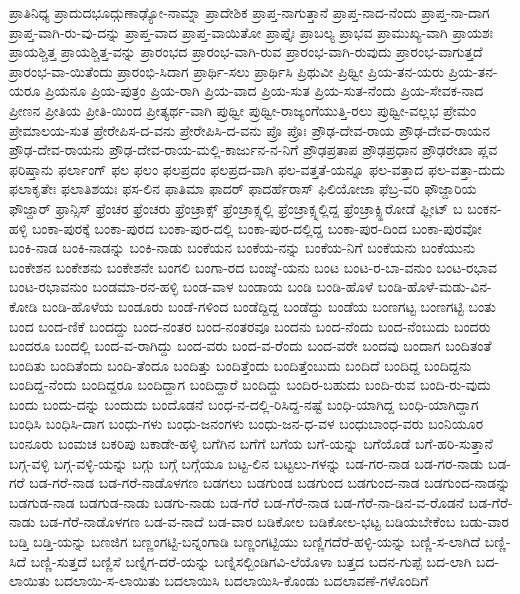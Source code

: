 {ಪ್ರಾತಿನಿಧ್ಯ
ಪ್ರಾದುದಭೂದ್ಗುಣಾಢ್ಯೋ-ನಾಮ್ನಾ
ಪ್ರಾದೇಶಿಕ
ಪ್ರಾಪ್ತ-ನಾಗುತ್ತಾನೆ
ಪ್ರಾಪ್ತ-ನಾದ-ನೆಂದು
ಪ್ರಾಪ್ತ-ನಾ-ದಾಗ
ಪ್ರಾಪ್ತ-ವಾಗಿ-ರು-ವು-ದನ್ನು
ಪ್ರಾಪ್ತ-ವಾದ
ಪ್ರಾಪ್ತ-ವಾಯಿತೋ
ಪ್ರಾಪ್ತೈಃ
ಪ್ರಾಬಲ್ಯ
ಪ್ರಾಭವ
ಪ್ರಾಮುಖ್ಯ-ವಾಗಿ
ಪ್ರಾಯಶಃ
ಪ್ರಾಯಶ್ಚಿತ್ತ
ಪ್ರಾಯಶ್ಚಿತ್ತ-ವನ್ನು
ಪ್ರಾರಂಭದ
ಪ್ರಾರಂಭ-ವಾಗಿ-ರುವ
ಪ್ರಾರಂಭ-ವಾಗಿ-ರುವುದು
ಪ್ರಾರಂಭ-ವಾಗುತ್ತದೆ
ಪ್ರಾರಂಭ-ವಾ-ಯಿತೆಂದು
ಪ್ರಾರಂಭಿ-ಸಿದಾಗ
ಪ್ರಾರ್ಥಿ-ಸಲು
ಪ್ರಾರ್ಥಿಸಿ
ಪ್ರಿಥುವೀ
ಪ್ರಿಥ್ವೀ
ಪ್ರಿಯ-ತನ-ಯರು
ಪ್ರಿಯ-ತನ-ಯರೂ
ಪ್ರಿಯನೂ
ಪ್ರಿಯ-ಪುತ್ರಂ
ಪ್ರಿಯ-ರಾಗಿ
ಪ್ರಿಯ-ವಾದ
ಪ್ರಿಯ-ಸುತ
ಪ್ರಿಯ-ಸುತ-ನೆಂದು
ಪ್ರಿಯ-ಸೇವಕ-ನಾದ
ಪ್ರೀಣನ
ಪ್ರೀತಿಯ
ಪ್ರೀತಿ-ಯಿಂದ
ಪ್ರೀತ್ಯರ್ಥ-ವಾಗಿ
ಪ್ರುಥ್ವೀ
ಪ್ರುಥ್ವೀ-ರಾಜ್ಯಂಗೆಯುತ್ತಿ-ರಲು
ಪ್ರುಥ್ವೀ-ವಲ್ಲಭ
ಪ್ರೇಮಂ
ಪ್ರೇಮಾಲಯ-ಸುತ
ಪ್ರೇರೇಪಿಸ-ದ-ವನು
ಪ್ರೇರೇಪಿಸಿ-ದ-ವನು
ಪ್ರೊ
ಪ್ರೊಃ
ಪ್ರೌಢ-ದೇವ-ರಾಯ
ಪ್ರೌಢ-ದೇವ-ರಾಯನ
ಪ್ರೌಢ-ದೇವ-ರಾಯನು
ಪ್ರೌಢ-ದೇವ-ರಾಯ-ಮಲ್ಲಿ-ಕಾರ್ಜುನ-ನ-ನಿಗೆ
ಪ್ರೌಢಪ್ರತಾಪ
ಪ್ರೌಢಪ್ರಧಾನ
ಪ್ರೌಢರೇಖಾ
ಪ್ಲವ
ಫರಿಷ್ತಾನು
ಫರ್ಲಾಂಗ್
ಫಲ
ಫಲಂ
ಫಲಪ್ರದಂ
ಫಲಪ್ರದ-ವಾಗಿ
ಫಲ-ವತ್ತತೆ-ಯನ್ನೂ
ಫಲ-ವತ್ತಾದ
ಫಲ-ವತ್ತಾ-ದುದು
ಫಲಾಕೃತೇಃ
ಫಲಾತಿಶಯಃ
ಫಸ-ಲಿನ
ಫಾತಿಮಾ
ಫಾದರ್
ಫಾದರ್ಹೆರಾಸ್
ಫಿಲಿಯೋಜಾ
ಫೆಬ್ರ-ವರಿ
ಫೌಜ್ದಾರಿಯ
ಫೌಜ್ದಾರ್
ಫ್ರಾನ್ಸಿಸ್
ಫ್ರೆಂಚರ
ಫ್ರೆಂಚರು
ಫ್ರೆಂಚ್ರಾಕ್ಸ್
ಫ್ರೆಂಚ್ರಾಕ್ಸ್ನಲ್ಲಿ
ಫ್ರೆಂಚ್ರಾಕ್ಸ್ನಲ್ಲಿದ್ದ
ಫ್ರೆಂಚ್ರಾಕ್ಸ್ಹಿರೋಡೆ
ಫ್ಲೀಟ್
ಬ
ಬಂಕನ-ಹಳ್ಳಿ
ಬಂಕಾ-ಪುರಕ್ಕೆ
ಬಂಕಾ-ಪುರದ
ಬಂಕಾ-ಪುರ-ದಲ್ಲಿ
ಬಂಕಾ-ಪುರ-ದಲ್ಲಿದ್ದ
ಬಂಕಾ-ಪುರ-ದಿಂದ
ಬಂಕಾ-ಪುರವೋ
ಬಂಕಿ-ನಾಡ
ಬಂಕಿ-ನಾಡನ್ನು
ಬಂಕಿ-ನಾಡು
ಬಂಕೆಯನ
ಬಂಕೆಯ-ನನ್ನು
ಬಂಕೆಯ-ನಿಗೆ
ಬಂಕೆಯನು
ಬಂಕೆಯುನು
ಬಂಕೇಶನ
ಬಂಕೇಶನು
ಬಂಕೇಶನೇ
ಬಂಗಲಿ
ಬಂಗಾ-ರದ
ಬಂಙ್ಕೆ-ಯನು
ಬಂಟ
ಬಂಟ-ರ-ಬಾ-ವನುಂ
ಬಂಟ-ರಭಾವ
ಬಂಟ-ರಭಾವನುಂ
ಬಂಡಮಾ-ರನ-ಹಳ್ಳಿ
ಬಂಡ-ವಾಳ
ಬಂಡಾಯ
ಬಂಡಿ
ಬಂಡಿ-ಹೊಳೆ
ಬಂಡಿ-ಹೊಳೆ-ಮಡು-ವಿನ-ಕೋಡಿ
ಬಂಡಿ-ಹೊಳೆಯ
ಬಂಡೂರು
ಬಂಡೆ-ಗಳಿಂದ
ಬಂಡೆದ್ದಿದ್ದ
ಬಂಡೆದ್ದು
ಬಂಡೆಯ
ಬಂಣಗಟ್ಟ
ಬಂಣಗಟ್ಟಿ
ಬಂತು
ಬಂದ
ಬಂದ-ಣಿಕೆ
ಬಂದದ್ದು
ಬಂದ-ನಂತರ
ಬಂದ-ನಂತರವೂ
ಬಂದನು
ಬಂದ-ನೆಂದು
ಬಂದ-ನೆಂಬುದು
ಬಂದರು
ಬಂದರೂ
ಬಂದಲ್ಲಿ
ಬಂದ-ವ-ರಾಗಿದ್ದು
ಬಂದ-ವರು
ಬಂದ-ವ-ರೆಂದು
ಬಂದ-ವರೇ
ಬಂದವು
ಬಂದಾಗ
ಬಂದಿತಂತೆ
ಬಂದಿತು
ಬಂದಿತೆಂದು
ಬಂದಿ-ತೆಂದೂ
ಬಂದಿತ್ತು
ಬಂದಿತ್ತೆಂದು
ಬಂದಿತ್ತೆಂಬುದು
ಬಂದಿದೆ
ಬಂದಿದ್ದ
ಬಂದಿದ್ದನು
ಬಂದಿದ್ದ-ನೆಂದು
ಬಂದಿದ್ದರೂ
ಬಂದಿದ್ದಾಗ
ಬಂದಿದ್ದಾರೆ
ಬಂದಿದ್ದು
ಬಂದಿರ-ಬಹುದು
ಬಂದಿ-ರುವ
ಬಂದಿ-ರು-ವುದು
ಬಂದು
ಬಂದು-ದನ್ನು
ಬಂದುದು
ಬಂದೊಡನೆ
ಬಂಧ-ನ-ದಲ್ಲಿ-ರಿಸಿದ್ದ-ನಷ್ಟೆ
ಬಂಧಿ-ಯಾಗಿದ್ದ
ಬಂಧಿ-ಯಾಗಿದ್ದಾಗ
ಬಂಧಿಸಿ
ಬಂಧಿಸಿ-ದಾಗ
ಬಂಧು-ಗಳು
ಬಂಧು-ಜನಂಗಳು
ಬಂಧು-ಜನ-ಧ-ವಳ
ಬಂಧುಬಾಂಧ-ವರು
ಬಂನಿಯೂರ
ಬಂನೂರು
ಬಂಮಚ
ಬಕರಿಪು
ಬಕಾಡೇ-ಹಳ್ಳಿ
ಬಗೆಗಿನ
ಬಗೆಗೆ
ಬಗೆಯ
ಬಗೆ-ಯನ್ನು
ಬಗೆಯೊಡೆ
ಬಗೆ-ಹರಿ-ಸುತ್ತಾನೆ
ಬಗ್ಗ-ವಳ್ಳಿ
ಬಗ್ಗ-ವಳ್ಳಿ-ಯನ್ನು
ಬಗ್ಗು
ಬಗ್ಗೆ
ಬಗ್ಗೆಯೂ
ಬಟ್ಟ-ಲಿನ
ಬಟ್ಟಲು-ಗಳನ್ನು
ಬಡ-ಗರ-ನಾಡ
ಬಡ-ಗರ-ನಾಡು
ಬಡ-ಗರೆ
ಬಡ-ಗರೆ-ನಾಡ
ಬಡ-ಗರೆ-ನಾಡೊಳಗಣ
ಬಡಗಲು
ಬಡಗುಂಡ
ಬಡಗುಂದ
ಬಡಗುಂದ-ನಾಡ
ಬಡಗುಂದ-ನಾಡನ್ನು
ಬಡಗುಡ-ನಾಡ
ಬಡಗುಡ-ನಾಡು
ಬಡಗು-ನಾಡು
ಬಡ-ಗೆರೆ
ಬಡ-ಗೆರೆ-ನಾಡ
ಬಡ-ಗೆರೆ-ನಾ-ಡಿನ-ವ-ರೊಡನೆ
ಬಡ-ಗೆರೆ-ನಾಡು
ಬಡ-ಗೆರೆ-ನಾಡೊಳಗಣ
ಬಡ-ವ-ನಾದೆ
ಬಡ-ವಾರ
ಬಡಿಕೋಲ
ಬಡಿಕೋಲ-ಭಟ್ಟ
ಬಡಿಯಬೇಕೆಂಬ
ಬಡು-ವಾರ
ಬಡ್ತಿ
ಬಡ್ತಿ-ಯನ್ನು
ಬಣಜಿಗ
ಬಣ್ಣಂಗಟ್ಟಿ-ಬನ್ನಂಗಾಡಿ
ಬಣ್ಣಂಗಟ್ಟಿಯು
ಬಣ್ಣಿಗದೆರೆ-ಹಳ್ಳಿ-ಯನ್ನು
ಬಣ್ಣಿ-ಸ-ಲಾಗಿದೆ
ಬಣ್ಣಿ-ಸಿದೆ
ಬಣ್ಣಿ-ಸುತ್ತದೆ
ಬಣ್ಣಿಸೆ
ಬಣ್ನಿಗ-ದರೆ-ಯನ್ನು
ಬಣ್ನಿಸಲ್ಬಿಂಡಿಗವಿ-ಲೆಯೊಳಾ
ಬತ್ತದ
ಬದನ-ಗುಪ್ಪೆ
ಬದ-ಲಾಗಿ
ಬದ-ಲಾಯಿತು
ಬದಲಾಯಿ-ಸ-ಲಾಯಿತು
ಬದಲಾಯಿಸಿ
ಬದಲಾಯಿಸಿ-ಕೊಂಡು
ಬದಲಾವಣೆ-ಗಳೊಂದಿಗೆ
}
